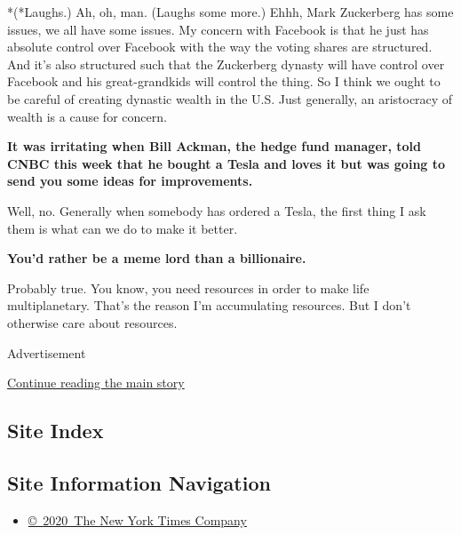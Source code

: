 *(*Laughs.) Ah, oh, man. (Laughs some more.) Ehhh, Mark Zuckerberg has
some issues, we all have some issues. My concern with Facebook is that
he just has absolute control over Facebook with the way the voting
shares are structured. And it's also structured such that the Zuckerberg
dynasty will have control over Facebook and his great-grandkids will
control the thing. So I think we ought to be careful of creating
dynastic wealth in the U.S. Just generally, an aristocracy of wealth is
a cause for concern.

\textbf{It was irritating when Bill Ackman, the hedge fund manager, told
CNBC this week that he bought a Tesla and loves it but was going to send
you some ideas for improvements.}

Well, no. Generally when somebody has ordered a Tesla, the first thing I
ask them is what can we do to make it better.

\textbf{You'd rather be a meme lord than a billionaire.}

Probably true. You know, you need resources in order to make life
multiplanetary. That's the reason I'm accumulating resources. But I
don't otherwise care about resources.

Advertisement

\protect\hyperlink{after-bottom}{Continue reading the main story}

\hypertarget{site-index}{%
\subsection{Site Index}\label{site-index}}

\hypertarget{site-information-navigation}{%
\subsection{Site Information
Navigation}\label{site-information-navigation}}

\begin{itemize}
\tightlist
\item
  \href{https://help.nytimes3xbfgragh.onion/hc/en-us/articles/115014792127-Copyright-notice}{©~2020~The
  New York Times Company}
\end{itemize}


